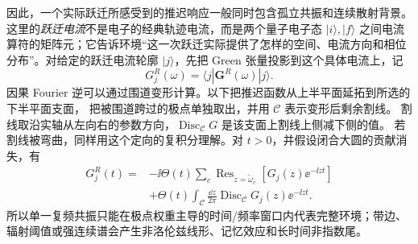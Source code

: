 因此，一个实际跃迁所感受到的推迟响应一般同时包含孤立共振和连续散射背景。这里的\emph{跃迁电流}不是电子的经典轨迹电流，而是两个量子电子态 $|i\rangle,|f\rangle$ 之间电流算符的矩阵元；它告诉环境“这一次跃迁实际提供了怎样的空间、电流方向和相位分布”。对给定的跃迁电流轮廓 $|j\rangle$，先把 Green 张量投影到这个具体电流上，记
\[
G_j^R(\omega)=\langle j|\mathbf G^R(\omega)|j\rangle .
\]
因果 Fourier 逆可以通过围道变形计算。以下把推迟函数从上半平面延拓到所选的下半平面支面，
把被围道跨过的极点单独取出，并用 $\mathcal C$ 表示变形后剩余割线。
割线取沿实轴从左向右的参数方向，$\operatorname{Disc}_{\mathcal C}G$ 是该支面上割线上侧减下侧的值。
若割线被弯曲，同样用这个定向的复积分理解。对 $t>0$，并假设闭合大圆的贡献消失，有
\begin{equation}
{
\begin{aligned}
G_j^R(t)
={}&-\ii\Theta(t)
\sum_c\operatorname{Res}_{z=\widetilde\omega_c}
[G_j(z)\ee^{-\ii zt}]\\
&+\Theta(t)\int_{\mathcal C}\frac{\dd z}{2\pi}
\operatorname{Disc}_{\mathcal C}G_j(z)\ee^{-\ii zt}.
\end{aligned}}
\label{eq:green_time_response_poles_plus_cut}
\end{equation}
所以单一复频共振只能在极点权重主导的时间/频率窗口内代表完整环境；带边、辐射阈值或强连续谱会产生非洛伦兹线形、记忆效应和长时间非指数尾。

